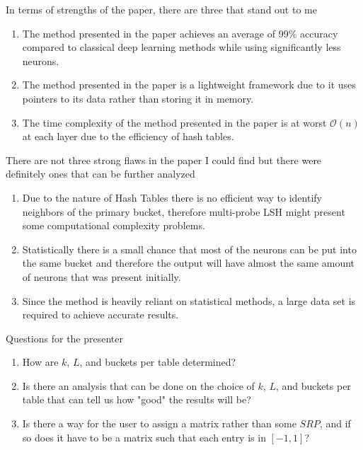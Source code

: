 \documentclass[12pt]{article}
\theoremstyle{remark}
\begin{document}
In terms of strengths of the paper, there are three that stand out to me
\begin{enumerate}
	\item The method presented in the paper achieves an average of 99\% accuracy compared to classical deep learning methods while using significantly less neurons.
	\item The method presented in the paper is a lightweight framework due to it uses pointers to its data rather than storing it in memory.
	\item The time complexity of the method presented in the paper is at worst $\mathcal{O}(n)$ at each layer due to the efficiency of hash tables.
\end{enumerate}

There are not three strong flaws in the paper I could find but there were definitely ones that can be further analyzed 
\begin{enumerate}
	\item Due to the nature of Hash Tables there is no efficient way to identify neighbors of the primary bucket, therefore multi-probe LSH might present some computational complexity problems.
	\item Statistically there is a small chance that most of the neurons can be put into the same bucket and therefore the output will have almost the same amount of neurons that was present initially.
	\item Since the method is heavily reliant on statistical methods, a large data set is required to achieve accurate results.
\end{enumerate}

Questions for the presenter
\begin{enumerate}
	\item How are $k$, $L$, and buckets per table determined? 
	\item Is there an analysis that can be done on the choice of $k$, $L$, and buckets per table that can tell us how "good" the results will be?
	\item Is there a way for the user to assign a matrix rather than some $SRP$, and if so does it have to be a matrix such that each entry is in $[-1,1]$?
\end{enumerate}
\end{document}
